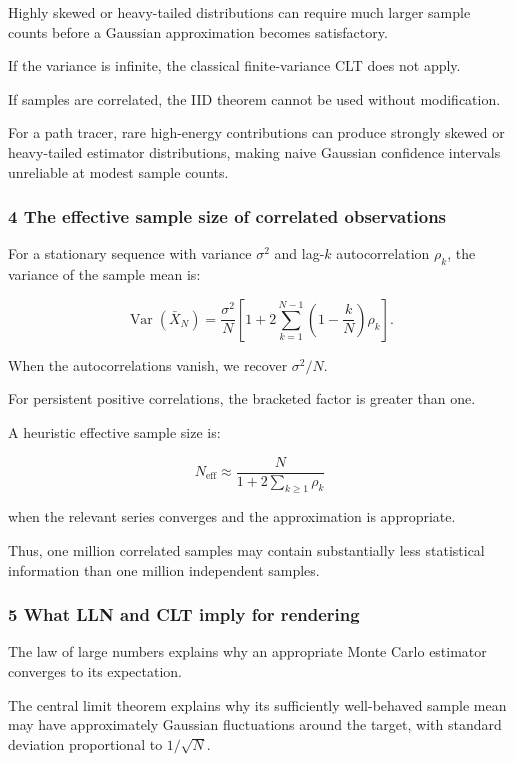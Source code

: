 Highly skewed or heavy-tailed distributions can require much larger sample counts before a Gaussian approximation becomes satisfactory.

If the variance is infinite, the classical finite-variance CLT does not apply.

If samples are correlated, the IID theorem cannot be used without modification.

For a path tracer, rare high-energy contributions can produce strongly skewed or heavy-tailed estimator distributions, making naive Gaussian confidence intervals unreliable at modest sample counts.

\subsubsection{4 The effective sample size of correlated observations}\label{02-foundations-ii-ch030-the-effective-sample-size-of-correlated-observations}

For a stationary sequence with variance \(\sigma^2\) and lag-\(k\) autocorrelation \(\rho_k\), the variance of the sample mean is:

\[
 \boxed{ \operatorname{Var}(\bar X_N) = \frac{\sigma^2}{N} \left[ 1+ 2\sum_{k=1}^{N-1} \left(1-\frac{k}{N}\right)\rho_k \right] }.
\]

When the autocorrelations vanish, we recover \(\sigma^2/N\).

For persistent positive correlations, the bracketed factor is greater than one.

A heuristic effective sample size is:

\[
 N_{\mathrm{eff}} \approx \frac{N}{ 1+2\sum_{k\ge1}\rho_k }
\]

when the relevant series converges and the approximation is appropriate.

Thus, one million correlated samples may contain substantially less statistical information than one million independent samples.

\subsubsection{5 What LLN and CLT imply for rendering}\label{02-foundations-ii-ch030-what-lln-and-clt-imply-for-rendering}

The law of large numbers explains why an appropriate Monte Carlo estimator converges to its expectation.

The central limit theorem explains why its sufficiently well-behaved sample mean may have approximately Gaussian fluctuations around the target, with standard deviation proportional to \(1/\sqrt N\).


